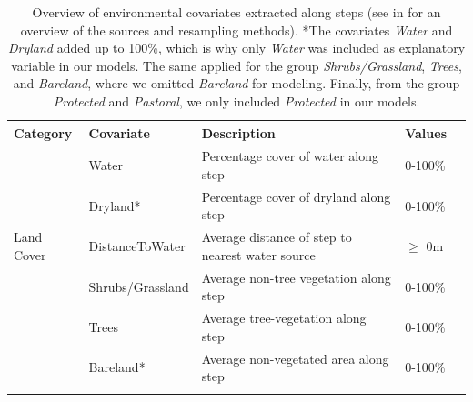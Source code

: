 \documentclass[abstract=on,10pt,a4paper,bibliography=totocnumbered]{scrartcl}
\begin{document}
\begin{table}[h]
  \begin{center}
    \caption{Overview of environmental covariates extracted along steps (see
     in  for an overview of the sources and
    resampling methods). *The covariates \textit{Water} and \textit{Dryland}
    added up to 100\%, which is why only \textit{Water} was included as
    explanatory variable in our models. The same applied for the group
    \textit{Shrubs/Grassland}, \textit{Trees}, and \textit{Bareland}, where we
    omitted \textit{Bareland} for modeling. Finally, from the group
    \textit{Protected} and \textit{Pastoral}, we only included
    \textit{Protected} in our models.}
    \label{ExtractedCovars}
    \resizebox{\textwidth}{!} {
      \begin{tabular}{lllll}
      \hline
      \textbf{Category} &
        \textbf{Covariate} &
          \textbf{Description} &
            \textbf{Values} \\
      \midrule
      \multirow{5}{*}{Land Cover}
        & Water
          & Percentage cover of water along step
            & 0-100\%\\
        & Dryland*
          & Percentage cover of dryland along step
            & 0-100\%\\
        & DistanceToWater
          & Average distance of step to nearest water source
            & \(\geq\) 0m\\
        & Shrubs/Grassland
          & Average non-tree vegetation along step
            & 0-100\%\\
        & Trees
          & Average tree-vegetation along step
            & 0-100\%\\
        & Bareland*
          & Average non-vegetated area along step
            & 0-100\%\\
      \hdashline
      \multirow{2}{*}{Protection Status}

\end{tabular}}
\end{center}
\end{table}
\end{document}

